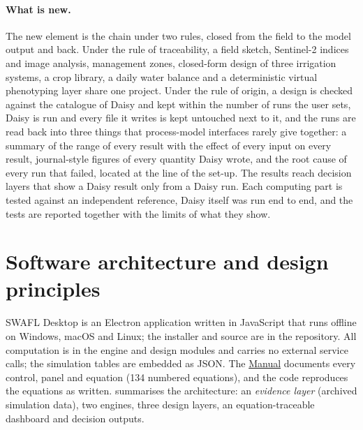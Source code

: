 \documentclass[preprint,12pt]{elsarticle}
\newcommand{\manuallink}{\href{\manualurl}{Manual}}
\newcommand{\manualurl}{https://github.com/halilunaziru73-creator/Coupled-Water-Fluxes-Pore-Scale-Dynamics-Precision-Irrigation-Mulching-Feedback-Loops/raw/main/Software/v1.1.0/SWAFL_Desktop/docs/manual_v1.1.0/SWAFL_Manual_v1.1.0.pdf}
\begin{document}
\paragraph{What is new.} The new element is the chain under two rules, closed from the field to the model output and back. Under the rule of traceability, a field sketch, Sentinel-2 indices and image analysis, management zones, closed-form design of three irrigation systems, a crop library, a daily water balance and a deterministic virtual phenotyping layer share one project. Under the rule of origin, a design is checked against the catalogue of Daisy and kept within the number of runs the user sets, Daisy is run and every file it writes is kept untouched next to it, and the runs are read back into three things that process-model interfaces rarely give together: a summary of the range of every result with the effect of every input on every result, journal-style figures of every quantity Daisy wrote, and the root cause of every run that failed, located at the line of the set-up. The results reach decision layers that show a Daisy result only from a Daisy run. Each computing part is tested against an independent reference, Daisy itself was run end to end, and the tests are reported together with the limits of what they show.

\section{Software architecture and design principles}
\label{sec:arch}
SWAFL Desktop is an Electron application written in JavaScript that runs offline on Windows, macOS and Linux; the installer and source are in the repository. All computation is in the engine and design modules and carries no external service calls; the simulation tables are embedded as JSON. The \manuallink{} documents every control, panel and equation (134 numbered equations), and the code reproduces the equations as written.  summarises the architecture: an \emph{evidence layer} (archived simulation data), two engines, three design layers, an equation-traceable dashboard and decision outputs.
\end{document}
